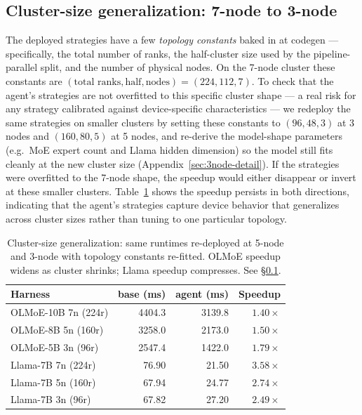 \subsection{Cluster-size generalization: 7-node to 3-node}
\label{sec:ablation-3node}

The deployed strategies have a few \emph{topology constants}
baked in at codegen --- specifically, the total number of ranks,
the half-cluster size used by the pipeline-parallel split, and
the number of physical nodes. On the 7-node cluster these
constants are $(\text{total ranks}, \text{half}, \text{nodes})
{=}(224, 112, 7)$. To check that the agent's strategies are not
overfitted to this specific cluster shape --- a real risk for
any strategy calibrated against device-specific characteristics
--- we redeploy the same strategies on smaller clusters by
setting these constants to $(96, 48, 3)$ at 3 nodes and
$(160, 80, 5)$ at 5 nodes, and re-derive the model-shape
parameters (e.g.\ MoE expert count and Llama hidden dimension)
so the model still fits cleanly at the new cluster size
(Appendix~\ref{sec:3node-detail}). If the strategies were
overfitted to the 7-node shape, the speedup would either
disappear or invert at these smaller clusters. Table~\ref{tab:ablation-3node}
shows the speedup persists in both directions, indicating that
the agent's strategies capture device behavior that
generalizes across cluster sizes rather than tuning to one
particular topology.

\begin{table}[!htbp]
\centering\footnotesize
\setlength{\tabcolsep}{4pt}
\begin{tabular}{lrrr}
\toprule
\textbf{Harness} & \textbf{base (ms)} & \textbf{agent (ms)} & \textbf{Speedup} \\
\midrule
OLMoE-10B 7n (224r) & 4404.3 & 3139.8 & $1.40\times$ \\
OLMoE-8B 5n (160r)  & 3258.0 & 2173.0 & $\mathbf{1.50\times}$ \\
OLMoE-5B 3n (96r)   & 2547.4 & 1422.0 & $\mathbf{1.79\times}$ \\
\midrule
Llama-7B 7n (224r)  & 76.90 & 21.50 & $3.58\times$ \\
Llama-7B 5n (160r)  & 67.94 & 24.77 & $\mathbf{2.74\times}$ \\
Llama-7B 3n (96r)   & 67.82 & 27.20 & $\mathbf{2.49\times}$ \\
\bottomrule
\end{tabular}
\caption{Cluster-size generalization: same runtimes re-deployed at
5-node and 3-node with topology constants re-fitted. OLMoE speedup
widens as cluster shrinks; Llama speedup compresses. See
§\ref{sec:ablation-3node}.}
\label{tab:ablation-3node}
\end{table}

